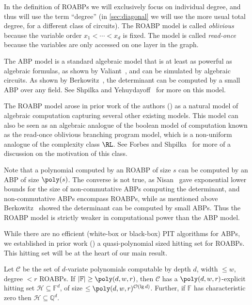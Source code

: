 \documentclass[letterpaper,11pt]{article}
\numberwithin{equation}{section}
\theoremstyle{plain}
\theoremstyle{remark}
\newcommand{\F}{\mathbb{F}}
\newcommand{\Q}{\mathbb{Q}}
\newcommand{\cC}{\mathcal{C}}
\newcommand{\cH}{\mathcal{H}}
\renewcommand{\O}{\mathcal{O}}
\begin{document}
In the definition of ROABPs we will exclusively focus on individual degree, and thus will use the term ``degree'' (in \autoref{sec:diagonal} we will use the more usual total degree, for a different class of circuits). The ROABP model is called \textit{oblivious} because the variable order $x_1<\cdots<x_d$ is fixed. The model is called \textit{read-once} because the variables are only accessed on one layer in the graph.

The ABP model is a standard algebraic model that is at least as powerful as algebraic formulas, as shown by Valiant~\cite{Valiant79a}, and can be simulated by algebraic circuits.  As shown by Berkowitz~\cite{Berkowitz84}, the determinant can be computed by a small ABP over any field.  See Shpilka and Yehuydayoff~\cite{SY10} for more on this model.

The ROABP model arose in prior work of the authors (\cite{ForbesShpilka12a}) as a natural model of algebraic computation capturing several other existing models.  This model can also be seen as an algebraic analogue of the boolean model of computation known as the read-once oblivious branching program model, which is a non-uniform analogue of the complexity class $\RL$.  See Forbes and Shpilka~\cite{ForbesShpilka12a} for more of a discussion on the motivation of this class.

Note that a polynomial computed by an ROABP of size $s$ can be computed by an ABP of size $\poly(s)$.  The converse is not true, as Nisan~\cite{Nisan91} gave exponential lower bounds for the size of non-commutative ABPs computing the determinant, and non-commutative ABPs encompass ROABPs, while as mentioned above Berkowitz~\cite{Berkowitz84} showed the determinant can be computed by small ABPs.  Thus the ROABP model is strictly weaker in computational power than the ABP model.

While there are no efficient (white-box or black-box) PIT algorithms for ABPs, we established in prior work (\cite{ForbesShpilka12a}) a quasi-polynomial sized hitting set for ROABPs.  This hitting set will be at the heart of our main result.

\begin{theorem}\label{thm:FS}
	Let $\cC$ be the set of $d$-variate polynomials computable by depth $d$, width $\le w$, degree $<r$ ROABPs.  If $|\F|\ge \poly(d,w,r)$, then $\mathcal{C}$ has a $\poly(d,w,r)$-explicit hitting set $\cH\subseteq\F^d$, of size $\le \poly(d,w,r)^{\O(\lg d)}$.  Further, if $\F$ has characteristic zero then $\cH\subseteq\Q^d$.
\end{theorem}
\end{document}

